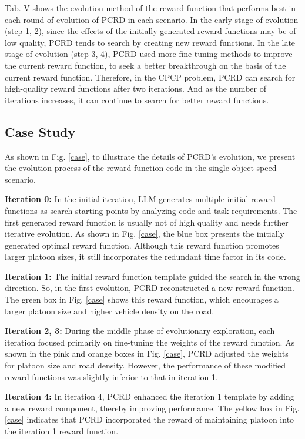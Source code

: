 \documentclass[lettersize,journal]{IEEEtran}
\begin{document}
Tab. V shows the evolution method of the reward function that performs best in each round of evolution of PCRD in each scenario. 
In the early stage of evolution (step 1, 2), since the effects of the initially generated reward functions may be of low quality, PCRD tends to search by creating new reward functions. 
In the late stage of evolution (step 3, 4), PCRD used more fine-tuning methods to improve the current reward function, to seek a better breakthrough on the basis of the current reward function.
Therefore, in the CPCP problem, PCRD can search for high-quality reward functions after two iterations. 
And as the number of iterations increases, it can continue to search for better reward functions.


\subsection{Case Study}
As shown in Fig. \ref{case}, to illustrate the details of PCRD's evolution, we present the evolution process of the reward function code in the single-object speed scenario.



\textbf{Iteration 0:} In the initial iteration, LLM generates multiple initial reward functions as search starting points by analyzing code and task requirements.
The first generated reward function is usually not of high quality and needs further iterative evolution. 
As shown in Fig. \ref{case}, the blue box presents the initially generated optimal reward function. 
Although this reward function promotes larger platoon sizes, it still incorporates the redundant time factor in its code.

\textbf{Iteration 1:} The initial reward function template guided the search in the wrong direction. 
So, in the first evolution, PCRD reconstructed a new reward function. 
The green box in Fig. \ref{case} shows this reward function, which encourages a larger platoon size and higher vehicle density on the road.

\textbf{Iteration 2, 3:} During the middle phase of evolutionary exploration, each iteration focused primarily on fine-tuning the weights of the reward function. 
As shown in the pink and orange boxes in Fig. \ref{case}, PCRD adjusted the weights for platoon size and road density. 
However, the performance of these modified reward functions was slightly inferior to that in iteration 1.

\textbf{Iteration 4:} In iteration 4, PCRD enhanced the iteration 1 template by adding a new reward component, thereby improving performance. 
The yellow box in Fig. \ref{case} indicates that PCRD incorporated the reward of maintaining platoon into the iteration 1 reward function.
 
\end{document}

